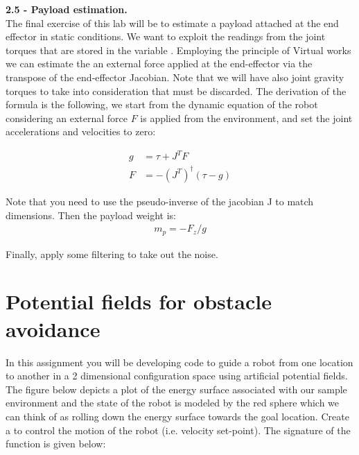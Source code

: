 \documentclass[11pt]{article}
\begin{document}
 
 
\textbf{2.5 - Payload estimation.}\\
The final exercise of this lab will be to estimate a payload attached at the end effector in static conditions. We want to exploit the readings from the  joint torques that are stored in the variable . Employing the principle of Virtual works we can estimate the an external force applied at the end-effector via the transpose of the end-effector Jacobian. Note that we will have also joint gravity torques to take into consideration that must be discarded.
The derivation of the formula is the following, we start from the dynamic equation of the robot considering an external force $F$ is applied from the environment, and set the joint accelerations and velocities to zero:

\begin{align*}
g &= \tau  + J^TF \\
F &= -(J^T)^\dagger (\tau - g) 
\end{align*}

Note that you need to use the pseudo-inverse of the jacobian J to match dimensions.  Then the payload weight is:
\begin{align*}
m_p = -F_z / g 
\end{align*}

Finally, apply some filtering to take out the noise. 




\section{Potential fields for obstacle avoidance}
In this assignment you will be developing code to guide a robot from one location to another in a
2 dimensional configuration space using artificial potential fields. The figure below depicts a plot of
the energy surface associated with our sample environment and the state of the robot is modeled by
the red sphere which we can think of as rolling down the energy surface towards the goal location.
Create a  to control the motion of the robot (i.e. velocity set-point).
The signature of the function is given below:

\end{document}

